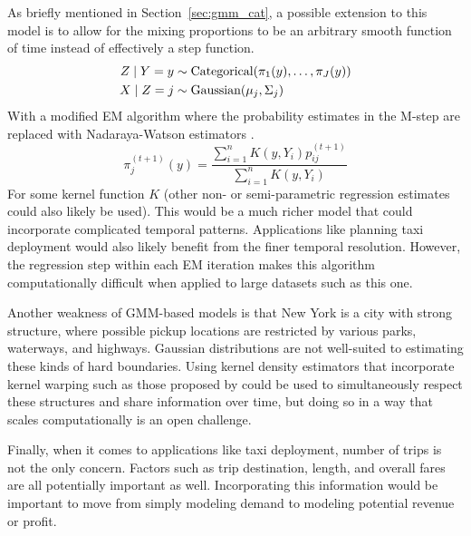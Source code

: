 \documentclass[12pt]{article}
\newcommand*{\cond}{\;\ifnum\currentgrouptype=16 \middle\fi|\;}
\newcommand*{\dist}{\sim}
\newcommand*{\mt}[1]{\text{\normalfont #1}}
\theoremstyle{definition}
\theoremstyle{algodesc}
\begin{document}
As briefly mentioned in Section~\ref{sec:gmm_cat}, a possible extension to this model is to allow for the mixing proportions to be an arbitrary smooth function of time instead of effectively a step function.
\begin{equation} \label{eq:gmm_smooth}
\begin{aligned}
Z \cond Y = y &\dist \mt{Categorical}(\pi_{1}(y), \dots, \pi_{J}(y)) \\
X \cond Z = j &\dist \mt{Gaussian}(\mu_j, \Sigma_j)
\end{aligned}
\end{equation}
With a modified EM algorithm where the probability estimates in the M-step are replaced with Nadaraya-Watson estimators \citep[as described in Chapter 6 of][]{esl}.
\begin{equation}
\pi^{(t+1)}_j(y) = \frac{\sum_{i=1}^n K(y, Y_i) p_{ij}^{(t+1)}}{\sum_{i=1}^n K(y, Y_i)}
\end{equation}
For some kernel function $K$ (other non- or semi-parametric regression estimates could also likely be used). This would be a much richer model that could incorporate complicated temporal patterns. Applications like planning taxi deployment would also likely benefit from the finer temporal resolution. However, the regression step within each EM iteration makes this algorithm computationally difficult when applied to large datasets such as this one.

Another weakness of GMM-based models is that New York is a city with strong structure, where possible pickup locations are restricted by various parks, waterways, and highways. Gaussian distributions are not well-suited to estimating these kinds of hard boundaries. Using kernel density estimators that incorporate kernel warping such as those proposed by \citet{zhoumatteson} could be used to simultaneously respect these structures and share information over time, but doing so in a way that scales computationally is an open challenge.

Finally, when it comes to applications like taxi deployment, number of trips is not the only concern. Factors such as trip destination, length, and overall fares are all potentially important as well. Incorporating this information would be important to move from simply modeling demand to modeling potential revenue or profit.




\end{document}
